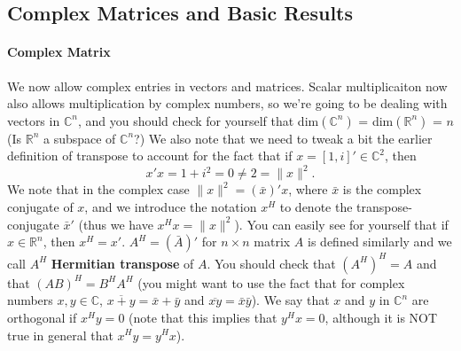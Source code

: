 \documentclass[12pt,oneside]{article}
\begin{document}
\subsection{Complex Matrices and Basic Results}
\paragraph{Complex Matrix}
We now allow complex entries in vectors and matrices. Scalar multiplicaiton now also allows multiplication by complex numbers, so we're going to be dealing with vectors in ${\mathbb{C}}^n$, and you should check for yourself that dim$({\mathbb{C}}^n)$ = dim$({\mathbb{R}}^n)$ = $n$ (Is $\mathbb{R}^n$ a subspace of $\mathbb{C}^n$?) We also note that we need to tweak a bit the earlier definition of transpose to account for the fact that if $x = \left[1, i \right] '\in {\mathbb{C}}^2$, then 
$$x'x = 1 + i^2 = 0 \neq 2 = \|x\|^2.$$ 
We note that in the complex case $\|x\|^2 = (\bar{x})'x$, where $\bar{x}$ is the complex conjugate of $x$, and we introduce the notation $x^H$ to denote the transpose-conjugate $\bar{x}'$ (thus we have $x^H x = \|x\|^2$). You can easily see for yourself that if $x \in \mathbb{R}^n$, then $x^H = x'$. $A^H = (\bar{A})'$ for $n \times n$ matrix $A$ is defined similarly and we call $A^H$ \textbf{Hermitian transpose} of $A$. You should check that $(A^H)^H = A$ and  that $(AB)^H = B^H A^H$ (you might want to use the fact that for complex numbers $x, y \in \mathbb{C}$, $\overline{x +  y} = \bar{x} + \bar{y}$ and $\overline{x y} = \bar{x} \bar{y}$). We say that $x$ and $y$ in $\mathbb{C}^n$ are orthogonal if $x^H y = 0$ (note that this implies that $y^H x = 0$, although it is NOT true in general that $x^H y = y^H x$).
\end{document}
